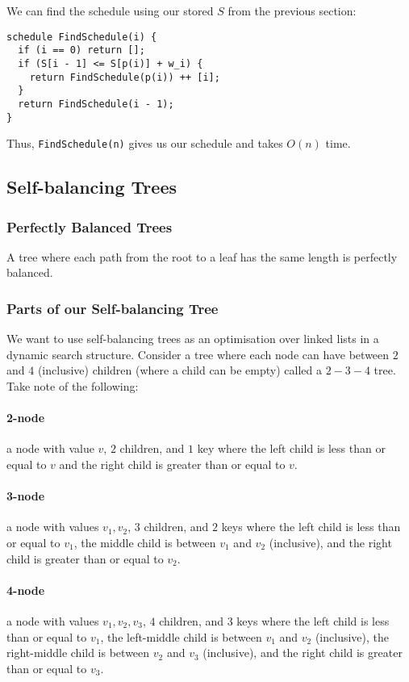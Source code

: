 We can find the schedule using our
stored $S$ from the previous section: \begin{lstlisting}
schedule FindSchedule(i) {
  if (i == 0) return [];
  if (S[i - 1] <= S[p(i)] + w_i) {
    return FindSchedule(p(i)) ++ [i]; 
  }
  return FindSchedule(i - 1);
}
\end{lstlisting} Thus, \texttt{FindSchedule(n)} gives us our schedule and 
takes $O(n)$ time.

\subsection{Self-balancing Trees}

\subsubsection{Perfectly Balanced Trees}
A tree where each path from the root to a leaf has the
same length is perfectly balanced.

\subsubsection{Parts of our Self-balancing Tree}
We want to use self-balancing trees as an optimisation over linked lists in a
dynamic search structure.
Consider a tree where each node can have between $2$ and $4$ (inclusive) children 
(where a child can be empty) called a $2-3-4$ tree. Take note of the following: 

  \paragraph{2-node} a node with value $v$, $2$ children, and $1$ key
  where the left child is less than or equal to $v$ and 
  the right child is greater than or equal to $v$.
  \paragraph{3-node} a node with values $v_1, v_2$, $3$ children, and $2$ keys
  where the left child is less than or equal to $v_1$, 
  the middle child is between $v_1$ and $v_2$ (inclusive),
  and the right child is greater than or equal to $v_2$.
  \paragraph{4-node} a node with values $v_1, v_2, v_3$, $4$ children, and $3$ keys
  where the left child is less than or equal to $v_1$, 
  the left-middle child is between $v_1$ and $v_2$ (inclusive),
  the right-middle child is between $v_2$ and $v_3$ (inclusive),
  and the right child is greater than or equal to $v_3$.

